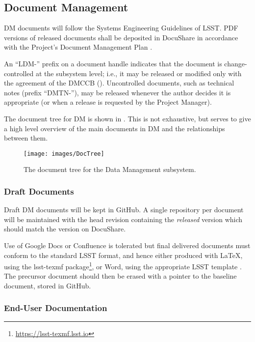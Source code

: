 \subsection {Document Management} \label{sect:docman}

DM documents will follow the Systems Engineering Guidelines of LSST. PDF versions of released documents shall be deposited in DocuShare in accordance with the Project's Document Management Plan .

An ``LDM-'' prefix on a document handle indicates that the document is change-controlled at the subsystem level; i.e., it may be released or modified only with the agreement of the DMCCB (). Uncontrolled documents, such as technical notes (prefix ``DMTN-''), may be released whenever the author decides it is appropriate (or when a release is requested by the Project Manager).

The document tree for DM is shown in . This is not exhaustive, but serves to give a high level overview of the main documents in DM and the relationships between them.

\begin{figure}
\begin{center}
 \texttt{[image: images/DocTree]}
\caption{The document tree for the Data Management subsystem.\label{fig:doctree}}
\end{center}
\end{figure}

\subsubsection{Draft Documents}

Draft DM documents will be kept in GitHub. A single repository per document will be maintained with the head revision containing the \emph{released} version which should match the version on DocuShare.

Use of Google Docs or Confluence is tolerated but final delivered documents must conform to the standard LSST format, and hence either produced with LaTeX, using the lsst-texmf package\footnote{\url{https://lsst-texmf.lsst.io}}, or Word, using the appropriate LSST template . The precursor document should then be erased with a pointer to the baseline document, stored in GitHub.

\subsubsection{End-User Documentation}

